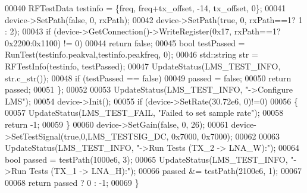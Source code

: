 \begin{DoxyCode}
00040         RFTestData testinfo = \{freq, freq+tx\_offset, -14, tx\_offset, 0\};
00041         device->SetPath(\textcolor{keyword}{false}, 0, rxPath);
00042         device->SetPath(\textcolor{keyword}{true}, 0, rxPath==1? 1 : 2);
00043         \textcolor{keywordflow}{if} (device->GetConnection()->WriteRegister(0x17, rxPath==1? 0x2200:0x1100) != 0)
00044             \textcolor{keywordflow}{return} \textcolor{keyword}{false};
00045         \textcolor{keywordtype}{bool} testPassed = RunTest(testinfo.peakval,testinfo.peakfreq, 0);
00046         std::string str = RFTestInfo(testinfo, testPassed);
00047         UpdateStatus(LMS_TEST_INFO, str.c\_str());
00048         \textcolor{keywordflow}{if} (testPassed == \textcolor{keyword}{false})
00049             passed = \textcolor{keyword}{false};
00050         \textcolor{keywordflow}{return} passed;
00051     \};
00052 
00053     UpdateStatus(LMS_TEST_INFO, \textcolor{stringliteral}{"->Configure LMS"});
00054     device->Init();
00055     \textcolor{keywordflow}{if} (device->SetRate(30.72e6, 0)!=0)
00056     \{
00057         UpdateStatus(LMS_TEST_FAIL, \textcolor{stringliteral}{"Failed to set sample rate"});
00058         \textcolor{keywordflow}{return} -1;
00059     \}
00060     device->SetGain(\textcolor{keyword}{false}, 0, 26);
00061     device->SetTestSignal(\textcolor{keyword}{true},0,LMS_TESTSIG_DC, 0x7000, 0x7000);
00062 
00063     UpdateStatus(LMS_TEST_INFO, \textcolor{stringliteral}{"->Run Tests (TX\_2 -> LNA\_W):"});
00064     \textcolor{keywordtype}{bool} passed = testPath(1000e6, 3);
00065     UpdateStatus(LMS_TEST_INFO, \textcolor{stringliteral}{"->Run Tests (TX\_1 -> LNA\_H):"});
00066     passed &= testPath(2100e6, 1);
00067 
00068     \textcolor{keywordflow}{return} passed ? 0 : -1;
00069 \}
\end{DoxyCode}
